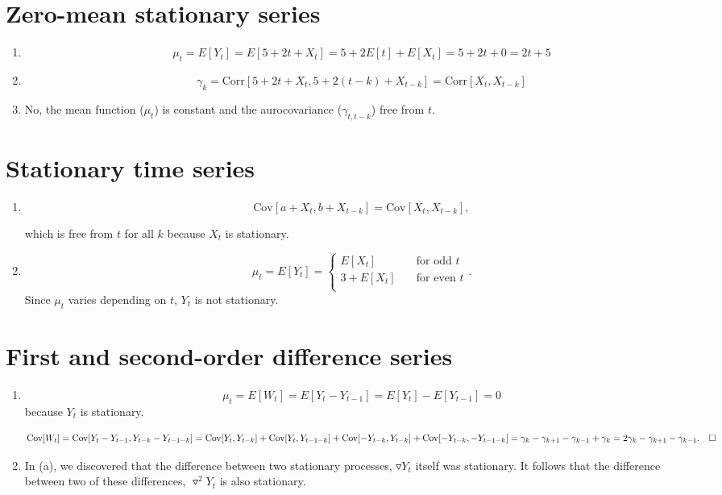 \documentclass[]{book}
\providecommand{\tightlist}{%
  \setlength{\itemsep}{0pt}\setlength{\parskip}{0pt}}
\begin{document}
\section{Zero-mean stationary series}\label{zero-mean-stationary-series}

\begin{enumerate}
\def\labelenumi{(\alph{enumi})}
\tightlist
\item
  \[\mu_t = E[Y_t] = E[5 + 2t + X_t] = 5 + 2E[t] + E[X_t] = 5 + 2t + 0 = 2t + 5\]
\item
  \[ \gamma_k = \text{Corr}[5+2t+X_t, 5+2(t-k)+X_{t-k}] = \text{Corr}[X_t, X_{t-k}]\]
\item
  No, the mean function (\(\mu_t\)) is constant and the aurocovariance
  (\(\gamma_{t,t-k}\)) free from \(t\).
\end{enumerate}

\section{Stationary time series}\label{stationary-time-series}

\begin{enumerate}
\def\labelenumi{(\alph{enumi})}
\item
  \[\text{Cov}[a + X_t, b + X_{t-k}] =\text{Cov}[X_t, X_{t-k}],\]

  which is free from \(t\) for all \(k\) because \(X_t\) is stationary.
\item
  \[
    \mu_t = E[Y_t] = 
      \begin{cases}
        E[X_t]       & \quad \text{for odd } t\\
        3 + E[X_t]   & \quad \text{for even } t\\
      \end{cases}.
  \] Since \(\mu_t\) varies depending on \(t\), \(Y_t\) is not
  stationary.
\end{enumerate}

\section{First and second-order difference
series}\label{first-and-second-order-difference-series}

\begin{enumerate}
\def\labelenumi{(\alph{enumi})}
\item
  \[\mu_t = E[W_t] = E[Y_t - Y_{t-1}] = E[Y_t] - E[Y_{t-1}] = 0\]
  because \(Y_t\) is stationary.

  \[
    \text{Cov}[W_t] = \text{Cov}[Y_t - Y_{t-1}, Y_{t-k} - Y_{t-1-k}] = \\
    \text{Cov}[Y_t, Y_{t-k}] + \text{Cov}[Y_t, Y_{t-1-k}] + \text{Cov}[-Y_{t-k}, Y_{t-k}] + \text{Cov}[-Y_{t-k}, -Y_{t-1-k}]=\\
    \gamma_k-\gamma_{k+1}-\gamma_{k-1}+\gamma_{k} = 2 \gamma_k - \gamma_{k+1} - \gamma_{k-1}. \quad \square
  \]
\item
  In (a), we discovered that the difference between two stationary
  processes, \(\triangledown Y_t\) itself was stationary. It follows
  that the difference between two of these differences,
  \(\triangledown^2Y_t\) is also stationary.
\end{enumerate}
\end{document}
